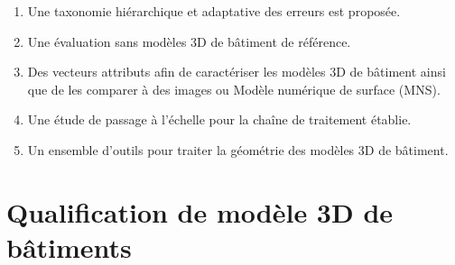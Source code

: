         \begin{enumerate}
            \item Une taxonomie hiérarchique et adaptative des erreurs est proposée.
            \item Une évaluation sans modèles 3D de bâtiment de référence.
            \item Des vecteurs attributs afin de caractériser les modèles 3D de bâtiment ainsi que de les comparer à des images ou Modèle numérique de surface (MNS).
            \item Une étude de passage à l'échelle pour la chaîne de traitement établie.
            \item Un ensemble d'outils pour traiter la géométrie des modèles 3D de bâtiment.
        \end{enumerate}

\section*{Qualification de modèle 3D de bâtiments}

